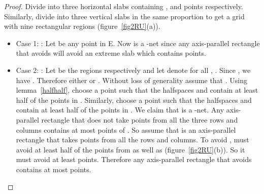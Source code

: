 \begin{proof}
 Divide  into three horizontal slabs containing , 
and  points respectively. Similarly, divide  into three
vertical slabs in the same proportion to get a grid with nine rectangular
regions (figure~\ref{fig2RU}(a)).
\begin{itemize}
 \item Case 1: : Let  be any point in E. Now 
is a -net since any axis-parallel rectangle that avoids  will
avoid an extreme slab which contains  points.
\item Case 2: : Let  be the regions  respectively and let  denote  for all , . Since , we have
. Therefore either  or
. Without loss of generality
assume that
. Using lemma~\ref{halfhalf}, choose a point  such that the halfspaces  and  contain at least half of the points in . Similarly, choose a point  such that the halfspaces
 and  contain at least half of the points in . We claim that  is a -net. Any axis-parallel rectangle that does not take points from all the three rows and columns contains at most  points of . So assume that  is an axis-parallel rectangle that takes points from all the rows and columns. To avoid ,  must avoid at least half of
the points from
 as well as 
(figure~\ref{fig2RU}(b)). So it must avoid at least
 points. Therefore any axis-parallel rectangle
that avoids  contains
at most  points.
\end{itemize}


\end{proof}

